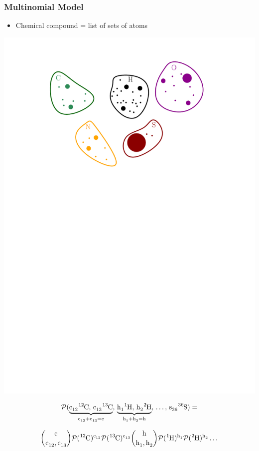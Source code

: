 \documentclass[xetex]{beamer}
\begin{document}
	\begin{frame}\frametitle{Multinomial Model}
			
		\begin{itemize}
			\item Chemical compound = list of sets of atoms 
			
		\end{itemize}
		\begin{center}
			\includegraphics[height=.4\textheight, keepaspectratio]{./picts/molecule.pdf}
		\end{center}

		$$ \prob( 
			\underbrace{\cem{c_{12}} \cem{^{12}C},\, \cem{c_{13}} \cem{^{13}C}}_{\cem{c_{12}}+ \cem{c_{13}} = \cem{c}},\,
			\underbrace{\cem{h_1} \cem{^{1}H},\,\cem{h_2} \cem{^{2}H}}_{\cem{h_1} + \cem{h_2} = \cem{h}}, 
			\,\dots,\, 
			\cem{s_{36}} \cem{^{36}S} ) 
			= 
			$$

		$$ 	{\cem{c} \choose \cem{c_{12}},\cem{c_{13}} }
			\prob(\cem{^{12}C})^{\cem{c_{12}}} \prob(\cem{^{13}C})^{\cem{c_{13}}} 
			{\cem{h} \choose \cem{h_{1}},\cem{h_{2}} }
			\prob(\cem{^{1}H})^{\cem{h_1}} \prob(\cem{^{2}H})^{\cem{h_2}}
			\dots $$	

	\end{frame}
\end{document}
